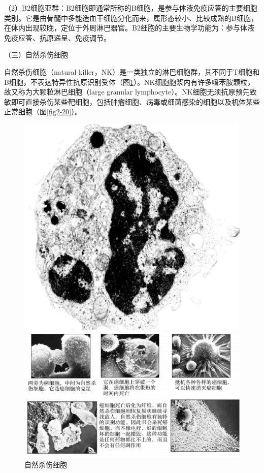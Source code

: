 （2）B2细胞亚群：B2细胞即通常所称的B细胞，是参与体液免疫应答的主要细胞类别。它是由骨髓中多能造血干细胞分化而来，属形态较小、比较成熟的B细胞，在体内出现较晚，定位于外周淋巴器官。B2细胞的主要生物学功能为：参与体液免疫应答、抗原递呈、免疫调节。

（三）自然杀伤细胞

自然杀伤细胞（natural
killer，NK）是一类独立的淋巴细胞群，其不同于T细胞和B细胞，不表达特异性抗原识别受体（图\ref{fig2-19}）。NK细胞胞浆内有许多嗜苯胺颗粒，故又称为大颗粒淋巴细胞（large
granular
lymphocyte）。NK细胞无须抗原预先致敏即可直接杀伤某些靶细胞，包括肿瘤细胞、病毒或细菌感染的细胞以及机体某些正常细胞（图\ref{fig2-20}）。
\begin{figure}[!htbp]
    \centering
    \begin{minipage}[b]{0.45\textwidth} 
      \centering
        \includegraphics[height=0.12\textheight]{./images/Image00044.jpg}
        \captionsetup{justification=centering}
        \caption{自然杀伤细胞}
        \label{fig2-19}
    \end{minipage}
\begin{minipage}[b]{0.45\textwidth} 
  \centering
    \includegraphics[height=0.2\textheight]{./images/Image00045.jpg}

\end{minipage}
\end{figure}
